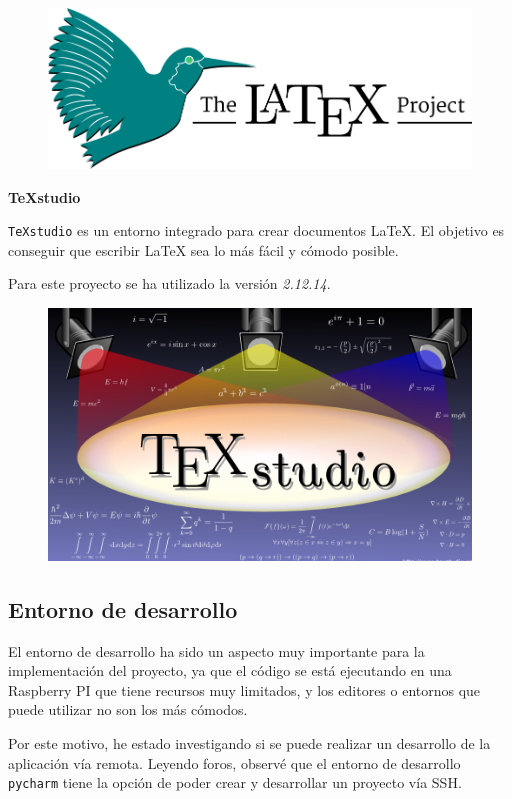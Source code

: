 \begin{figure}[h]
	\centering
	\includegraphics[scale=0.18]{images/16}
\end{figure}

\textbf{TeXstudio}

\texttt{TeXstudio} \cite{ref21} es un entorno integrado para crear documentos LaTeX. El objetivo es conseguir que escribir LaTeX sea lo más fácil y cómodo posible.

Para este proyecto se ha utilizado la versión \textit{2.12.14}.

\begin{figure}[h]
	\centering
	\includegraphics[scale=0.3]{images/17}
\end{figure}

\subsection{Entorno de desarrollo}

El entorno de desarrollo ha sido un aspecto muy importante para la implementación del proyecto, ya que el código se está ejecutando en una Raspberry PI que tiene recursos muy limitados, y los editores o entornos que puede utilizar no son los más cómodos.

Por este motivo, he estado investigando si se puede realizar un desarrollo de la aplicación vía remota. Leyendo foros, observé que el entorno de desarrollo \texttt{pycharm} tiene la opción de poder crear y desarrollar un proyecto vía SSH.

